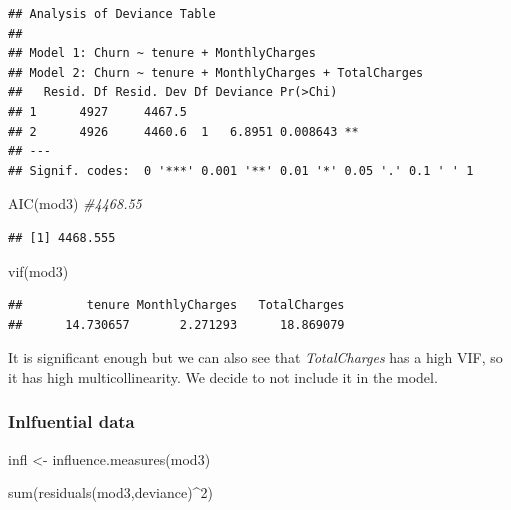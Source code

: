 \documentclass[
  twoside]{article}
\newenvironment{Shaded}{\begin{snugshade}}{\end{snugshade}}
\newcommand{\CommentTok}[1]{\textcolor[rgb]{0.56,0.35,0.01}{\textit{#1}}}
\newcommand{\DecValTok}[1]{\textcolor[rgb]{0.00,0.00,0.81}{#1}}
\newcommand{\FunctionTok}[1]{\textcolor[rgb]{0.00,0.00,0.00}{#1}}
\newcommand{\NormalTok}[1]{#1}
\newcommand{\OtherTok}[1]{\textcolor[rgb]{0.56,0.35,0.01}{#1}}
\newcommand{\SpecialCharTok}[1]{\textcolor[rgb]{0.00,0.00,0.00}{#1}}
\newcommand{\StringTok}[1]{\textcolor[rgb]{0.31,0.60,0.02}{#1}}
\begin{document}
\begin{verbatim}
## Analysis of Deviance Table
## 
## Model 1: Churn ~ tenure + MonthlyCharges
## Model 2: Churn ~ tenure + MonthlyCharges + TotalCharges
##   Resid. Df Resid. Dev Df Deviance Pr(>Chi)   
## 1      4927     4467.5                        
## 2      4926     4460.6  1   6.8951 0.008643 **
## ---
## Signif. codes:  0 '***' 0.001 '**' 0.01 '*' 0.05 '.' 0.1 ' ' 1
\end{verbatim}

\begin{Shaded}
\begin{Highlighting}[]
\FunctionTok{AIC}\NormalTok{(mod3) }\CommentTok{\#4468.55}
\end{Highlighting}
\end{Shaded}

\begin{verbatim}
## [1] 4468.555
\end{verbatim}

\begin{Shaded}
\begin{Highlighting}[]
\FunctionTok{vif}\NormalTok{(mod3)}
\end{Highlighting}
\end{Shaded}

\begin{verbatim}
##         tenure MonthlyCharges   TotalCharges 
##      14.730657       2.271293      18.869079
\end{verbatim}

It is significant enough but we can also see that \emph{TotalCharges}
has a high VIF, so it has high multicollinearity. We decide to not
include it in the model.

\hypertarget{inlfuential-data}{%
\subsubsection{Inlfuential data}\label{inlfuential-data}}

\begin{Shaded}
\begin{Highlighting}[]
\NormalTok{infl }\OtherTok{\textless{}{-}} \FunctionTok{influence.measures}\NormalTok{(mod3)}

\FunctionTok{sum}\NormalTok{(}\FunctionTok{residuals}\NormalTok{(mod3,}\StringTok{\textquotesingle{}deviance\textquotesingle{}}\NormalTok{)}\SpecialCharTok{\^{}}\DecValTok{2}\NormalTok{)}
\end{Highlighting}
\end{Shaded}
\end{document}
